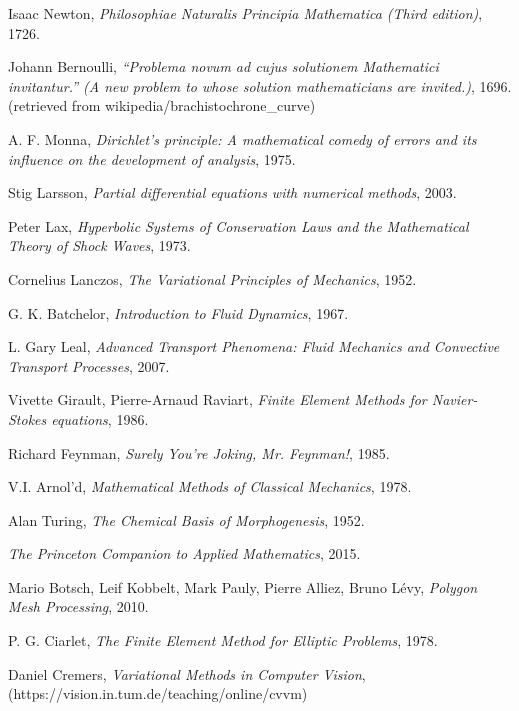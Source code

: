 \documentclass[11pt,a4paper]{memoir}
\begin{document}
\begin{thebibliography}{9}

Isaac Newton,
\textit{Philosophiae Naturalis Principia Mathematica (Third edition)},
1726.

Johann Bernoulli,
\textit{``Problema novum ad cujus solutionem Mathematici invitantur.'' (A new problem to whose solution mathematicians are invited.)},
1696.
(retrieved from wikipedia/brachistochrone\_curve)

A. F. Monna,
\textit{Dirichlet's principle: A mathematical comedy of errors and its influence on the development of analysis},
1975.

Stig Larsson,
\textit{Partial differential equations with numerical methods},
2003.

Peter Lax,
\textit{Hyperbolic Systems of Conservation Laws and the Mathematical Theory of Shock Waves},
1973.

Cornelius Lanczos,
\textit{The Variational Principles of Mechanics},
1952.

G. K. Batchelor,
\textit{Introduction to Fluid Dynamics},
1967.

L. Gary Leal,
\textit{Advanced Transport Phenomena: Fluid Mechanics and Convective Transport Processes},
2007.

Vivette Girault, Pierre-Arnaud Raviart,
\textit{Finite Element Methods for Navier-Stokes equations},
1986.

Richard Feynman,
\textit{Surely You're Joking, Mr. Feynman!},
1985.

V.I. Arnol'd,
\textit{Mathematical Methods of Classical Mechanics},
1978.

Alan Turing,
\textit{The Chemical Basis of Morphogenesis},
1952.

\textit{The Princeton Companion to Applied Mathematics},
2015.

Mario Botsch, Leif Kobbelt, Mark Pauly, Pierre Alliez, Bruno L\'evy,
\textit{Polygon Mesh Processing},
2010.

P. G. Ciarlet,
\textit{The Finite Element Method for Elliptic Problems},
1978.

Daniel Cremers,
\textit{Variational Methods in Computer Vision},
\\(https://vision.in.tum.de/teaching/online/cvvm)


\end{thebibliography}
\end{document}
